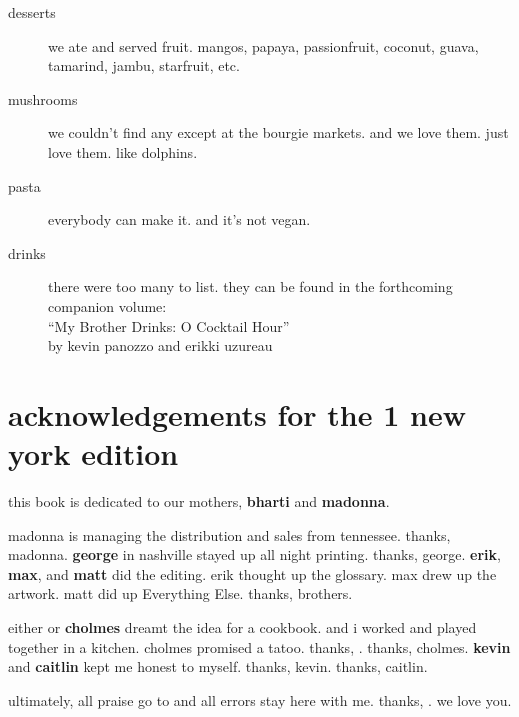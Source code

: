 \begin{description}

  \item[desserts] we ate and served fruit.  mangos, papaya,
  passionfruit, coconut, guava, tamarind, jambu, starfruit, etc.

  \item[mushrooms] we couldn't find any except at the bourgie
  markets. and we love them. just love them. like dolphins.

  \item[pasta] everybody can make it. and it's not vegan.

  \item[drinks] there were too many to list. they can be found in the
  forthcoming companion volume:\\``My Brother Drinks: O  Cocktail
  Hour''\\by kevin panozzo and erikki uzureau

\end{description}

\section{acknowledgements for the 1 new york edition}

this book is dedicated to our mothers, \textbf{bharti} and
\textbf{madonna}.

madonna is managing the distribution and sales from tennessee. thanks,
madonna. \textbf{george} in nashville stayed up all night
printing. thanks, george. \textbf{erik}, \textbf{max}, and
\textbf{matt} did the editing. erik thought up the glossary. max drew
up the artwork. matt did up Everything Else. thanks, brothers.

either \textbf{} or \textbf{cholmes} dreamt the idea for a
 cookbook.  and i worked and played together in a 
kitchen. cholmes promised a  tatoo. thanks, . thanks,
cholmes. \textbf{kevin} and \textbf{caitlin} kept me honest to
myself. thanks, kevin. thanks, caitlin.

ultimately, all praise go to \textbf{} and all errors stay here
with me. thanks, . we love you.
